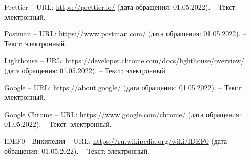 \begin{thebibliography}{00}
        Prettier
        --
        URL:
        \href{https://prettier.io/}{https://prettier.io/}
        (дата обращения: 01.05.2022).
        --
        Текст: электронный.

        Postman
        --
        URL:
        \href{https://www.postman.com/}{https://www.postman.com/}
        (дата обращения: 01.05.2022).
        --
        Текст: электронный.

        Lighthouse
        --
        URL:
        \href{https://developer.chrome.com/docs/lighthouse/overview/}{https://developer.chrome.com/docs/lighthouse/overview/}
        (дата обращения: 01.05.2022).
        --
        Текст: электронный.

        Google
        --
        URL:
        \href{https://about.google/}{https://about.google/}
        (дата обращения: 01.05.2022).
        --
        Текст: электронный.

        Google Chrome
        --
        URL:
        \href{https://www.google.com/chrome/}{https://www.google.com/chrome/}
        (дата обращения: 01.05.2022).
        --
        Текст: электронный.

        IDEF0 - Википедия
        --
        URL:
        \href{https://ru.wikipedia.org/wiki/IDEF0}{https://ru.wikipedia.org/wiki/IDEF0}
        (дата обращения: 01.05.2022).
        --
        Текст: электронный.
        

\begin{comment}

    \bibitem{livejournal}
        Главное - ЖЖ
        [Электронный ресурс] //
        LiveJournal — сервис для ведения блога и развития сообщества
        --
        Режим доступа:
        \href{https://www.livejournal.com/}{https://www.livejournal.com/}
        
    \bibitem{kickstarter}
        Kickstarter
        [Электронный ресурс] //
        Kickstarter - краудфандинговая платформа.
        --
        Режим доступа:
        \href{https://www.kickstarter.com/}{https://www.kickstarter.com/}

    \bibitem{ozon}
        OZON — интернет-магазин. Миллионы товаров по выгодным ценам
        [Электронный ресурс] //
        OZON. Интернет магазин
        --
        Режим доступа:
        \href{https://www.ozon.ru/}{https://www.ozon.ru/}


\end{comment}
\end{thebibliography}
